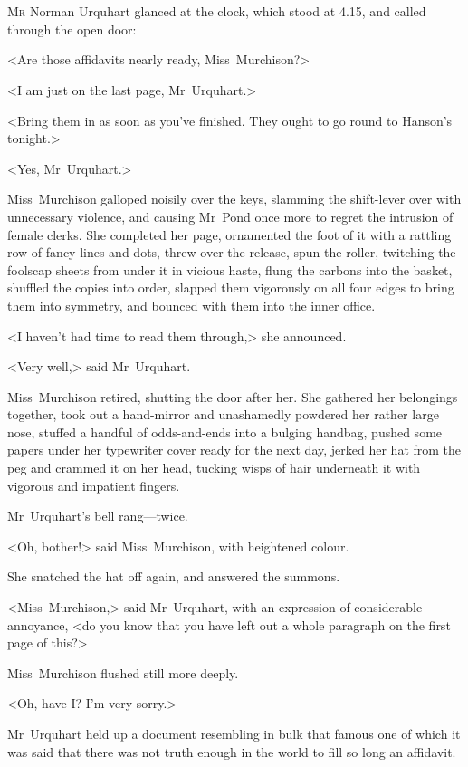 \chapter[Chapter \thechapter]{}
\lettrine{M}{r} Norman Urquhart glanced at the clock, which stood at 4.15, and called through the open door:

\zz
<Are those affidavits nearly ready, Miss~Murchison?>

\zz
<I am just on the last page, Mr~Urquhart.>

<Bring them in as soon as you've finished. They ought to go round to Hanson's tonight.>

<Yes, Mr~Urquhart.>

Miss~Murchison galloped noisily over the keys, slamming the shift-lever over with unnecessary violence, and causing Mr~Pond once more to regret the intrusion of female clerks. She completed her page, ornamented the foot of it with a rattling row of fancy lines and dots, threw over the release, spun the roller, twitching the foolscap sheets from under it in vicious haste, flung the carbons into the basket, shuffled the copies into order, slapped them vigorously on all four edges to bring them into symmetry, and bounced with them into the inner office.

<I haven't had time to read them through,> she announced.

<Very well,> said Mr~Urquhart.

Miss~Murchison retired, shutting the door after her. She gathered her belongings together, took out a hand-mirror and unashamedly powdered her rather large nose, stuffed a handful of odds-and-ends into a bulging handbag, pushed some papers under her typewriter cover ready for the next day, jerked her hat from the peg and crammed it on her head, tucking wisps of hair underneath it with vigorous and impatient fingers.

Mr~Urquhart's bell rang—twice.

<Oh, bother!> said Miss~Murchison, with heightened colour.

She snatched the hat off again, and answered the summons.

<Miss~Murchison,> said Mr~Urquhart, with an expression of considerable annoyance, <do you know that you have left out a whole paragraph on the first page of this?>

Miss~Murchison flushed still more deeply.

<Oh, have I? I'm very sorry.>

Mr~Urquhart held up a document resembling in bulk that famous one of which it was said that there was not truth enough in the world to fill so long an affidavit.

